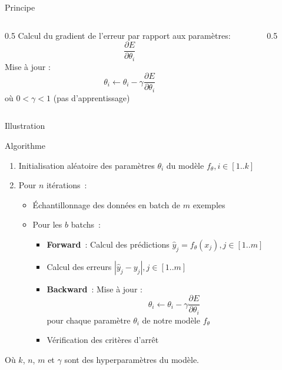 
\begin{frame}{Principe}
  \begin{columns}
    \begin{column}{0.5\tw}
      Calcul du gradient de l'erreur par rapport aux paramètres:
      \[
        \frac{\partial{E}}{\partial{\theta_i}}
      \]
      Mise à jour :
      \[
        \theta_i \leftarrow \theta_i - \gamma\frac{\partial{E}}{\partial{\theta_i}}
      \]
      où $0 < \gamma < 1$ (pas d'apprentissage)
    \end{column}
    \begin{column}{0.5\tw}
    \end{column}
  \end{columns}
\end{frame}

\begin{frame}{Illustration}
\end{frame}

\begin{frame}{Algorithme}
  \begin{enumerate}[<+->]
    \item Initialisation aléatoire des paramètres $\theta_i$ du modèle $f_{\theta}, i\in[1..k]$
    \item Pour $n$ itérations~:
      \begin{itemize}
        \item Échantillonnage des données en batch de $m$ exemples
        \item Pour les $b$ batchs~:
        \begin{itemize}
          \item \textbf{Forward}~: Calcul des prédictions $\hat{y}_j = f_{\theta}(x_j), j\in[1..m]$
          \item Calcul des erreurs $|\hat{y}_j-y_j|, j\in[1..m]$
          \item \textbf{Backward}~: Mise à jour :
          \[
            \theta_i \leftarrow \theta_i - \gamma\frac{\partial{E}}{\partial{\theta_i}}
          \]
          pour chaque paramètre $\theta_i$ de notre modèle $f_\theta$ \\$\,$

          \item Vérification des critères d'arrêt
        \end{itemize}
      \end{itemize}
  \end{enumerate}

  Où $k$, $n$, $m$ et $\gamma$ sont des hyperparamètres du modèle.
\end{frame}


